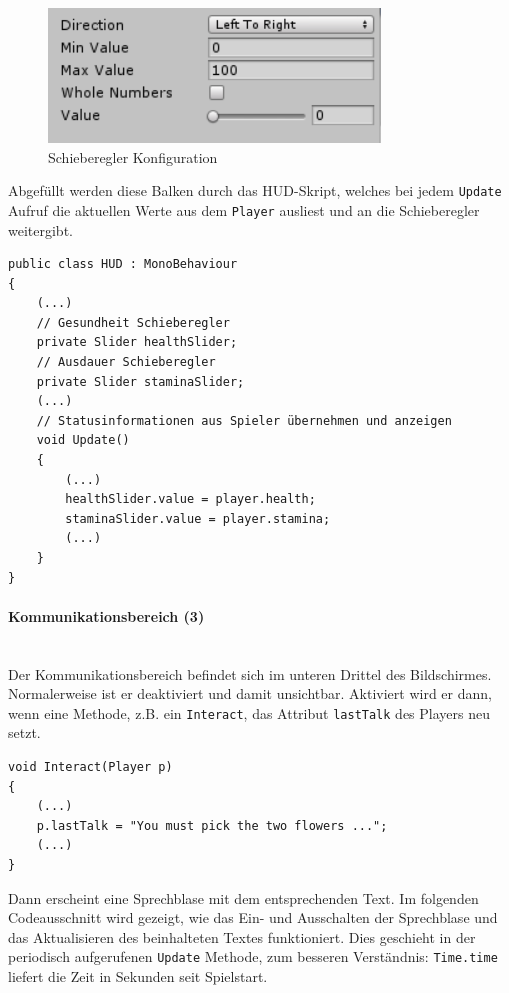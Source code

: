 \begin{figure}[H]
\includegraphics[scale=1]{screenshots/nullhundert.png}
\caption{Schieberegler Konfiguration}
\end{figure}

\noindent Abgefüllt werden diese Balken durch das HUD-Skript, welches bei jedem \lstinline{Update} Aufruf die aktuellen Werte aus dem \lstinline{Player} ausliest und an die Schieberegler weitergibt.

\begin{lstlisting}[caption={Schieberegler aktualisieren}]
public class HUD : MonoBehaviour
{
	(...)
	// Gesundheit Schieberegler
	private Slider healthSlider;
	// Ausdauer Schieberegler
	private Slider staminaSlider;
	(...)
	// Statusinformationen aus Spieler übernehmen und anzeigen
	void Update()
	{
		(...)
		healthSlider.value = player.health;
		staminaSlider.value = player.stamina;
		(...)
	}
}
\end{lstlisting}

\paragraph{Kommunikationsbereich (3)}\mbox{} \\
Der Kommunikationsbereich befindet sich im unteren Drittel des Bildschirmes.
Normalerweise ist er deaktiviert und damit unsichtbar.
Aktiviert wird er dann, wenn eine Methode, z.B. ein \lstinline{Interact}, das Attribut \lstinline{lastTalk} des Players neu setzt. 

\begin{lstlisting}[caption={Kommunikation setzen}]
void Interact(Player p)
{
	(...)
	p.lastTalk = "You must pick the two flowers ...";
	(...)
}
\end{lstlisting}

Dann erscheint eine Sprechblase mit dem entsprechenden Text. Im folgenden Codeausschnitt wird gezeigt, wie das Ein- und Ausschalten der Sprechblase und  das Aktualisieren des beinhalteten Textes funktioniert. Dies geschieht in der periodisch aufgerufenen \lstinline{Update} Methode, zum besseren Verständnis: \lstinline{Time.time} liefert die Zeit in Sekunden seit Spielstart.

